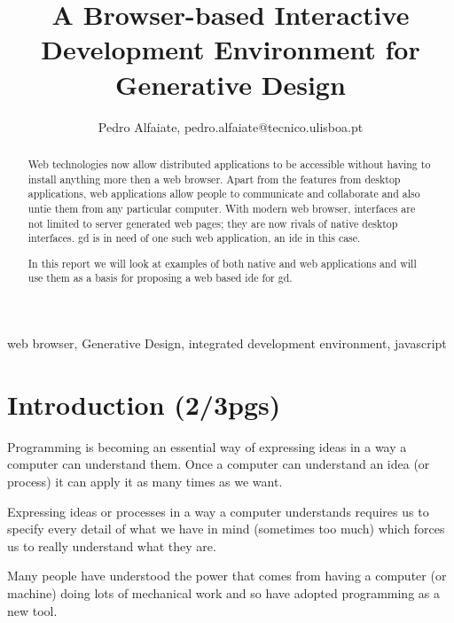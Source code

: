 \documentclass{./llncs2e/llncs}
\begin{document}
\title{A Browser-based Interactive Development Environment for Generative Design}

\author{Pedro Alfaiate, pedro.alfaiate@tecnico.ulisboa.pt}

\maketitle

\begin{abstract}
	Web technologies now allow distributed applications to be accessible without having to install anything more then a web browser.
	Apart from the features from desktop applications, web applications allow people to communicate and collaborate and also untie them from any particular computer.
	With modern web browser, interfaces are not limited to server generated web pages;
	they are now rivals of native desktop interfaces.
	\ac{gd} is in need of one such web application, an \ac{ide} in this case.
	
	In this report we will look at examples of both native and web applications and will use them as a basis for proposing a web based \ac{ide} for \ac{gd}.
\end{abstract}
\begin{keywords}
web browser, Generative Design, integrated development environment, javascript
\end{keywords}
\section{Introduction (2/3pgs)}
	Programming is becoming an essential way of expressing ideas in a way a computer can understand them.
	Once a computer can understand an idea (or process) it can apply it as many times as we want.

	Expressing ideas or processes in a way a computer understands requires us to specify every detail of what we have in mind (sometimes too much) which forces us to really understand what they are.

	Many people have understood the power that comes from having a computer (or machine) doing lots of mechanical work and so have adopted programming as a new tool.
\end{document}

